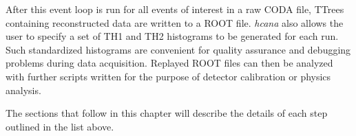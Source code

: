 

After this event loop is run for all events of interest in a raw CODA file,
TTrees containing reconstructed data are written to a ROOT file.
\textit{hcana} also allows the user to specify a set of TH1 and TH2 histograms
to be generated for each run.
Such standardized histograms are convenient for quality assurance and debugging
problems during data acquisition.
Replayed ROOT files can then be analyzed with further scripts written for the
purpose of detector calibration or physics analysis.


The sections that follow in this chapter will describe the details of each step
outlined in the list above.
